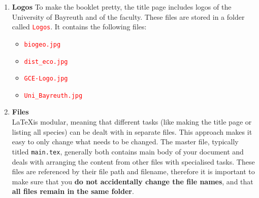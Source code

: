 \documentclass[a4paper,12pt,twoside]{article}
\begin{document}
\begin{enumerate}
\begin{itemize}
            \item  If the file becomes too large or you want to work on your project locally, you can move to one of the many editors capable of compiling \LaTeX  code. I personally recommend \textcolor{orange}{TeXMaker}, which is a dedicated \LaTeX   editor. TeXMaker is open source and cross-platform, meaning that Windows, Linux, and MaC OS users alike should be able to work with it. If you’re already working with programming languages like R or Python and already have a preferred integrated development environment (like \textcolor{orange}{Visual Studio} or \textcolor{orange}{Sublime}), you can also use that. This guide will include screenshots of both TeXMaker and Overleaf as examples. 
            In order for your editor to interpret \LaTeX \ code, you also need to install \textcolor{red}{TeX Live}. This isn't complicated, but unfortunately takes a while (up to four hours) due to its large size. You can find a list of installation/good instruction links below:
            \begin{itemize}
                \item Step-by-step instructions (by Uni Regensburg): \url{https://www.uni-regensburg.de/assets/physik/fakultaet/Studium/LaTeX/Anleitung\_Installation\_LaTeX\_01.pdf}
                \item TeX Live: \url{https://www.tug.org/texlive/}
                \item TeXMaker: \url{https://www.xm1math.net/texmaker/download.html}
            \end{itemize}.
        \end{itemize}
    \item \textbf{Logos}
        To make the booklet pretty, the title page includes logos of the University of Bayreuth and of the faculty. These files are stored in a folder called \textcolor{red}{\texttt{Logos}}. It contains the following files:
        \begin{itemize}
            \item \textcolor{red}{\texttt{biogeo.jpg}}
            \item \textcolor{red}{\texttt{dist\_eco.jpg}}
            \item \textcolor{red}{\texttt{GCE-Logo.jpg}}
            \item \textcolor{red}{\texttt{Uni\_Bayreuth.jpg}}
        \end{itemize}
    \item \textbf{Files}\\ 
        \LaTeX is modular, meaning that different tasks (like making the title page or listing all species) can be dealt with in separate files. This approach makes it easy to only change what needs to be changed. The master file, typically titled \texttt{main.tex}, generally both contains main body of your document and deals with arranging the content from other files with specialised tasks. These files are referenced by their file path and filename, therefore it is important to make sure that you \textbf {do not accidentally change the file names}, and that \textbf{all files remain in the same folder}. \\


\end{enumerate}
\end{document}
